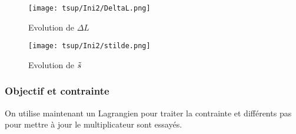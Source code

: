 \documentclass[11pt,a4paper]{article}
\begin{document}
\begin{itemize}
	\begin{figure}[H]
		\begin{minipage}{0.45\textwidth}
			\centering
			\texttt{[image: tsup/Ini2/DeltaL.png]}
			\caption{Evolution de $\Delta L$}
		\end{minipage}
		\begin{minipage}{0.45\textwidth}
			\centering
			\texttt{[image: tsup/Ini2/stilde.png]}
			\caption{Evolution de $\tilde{s}$}
		\end{minipage}
	\end{figure}
	
\end{itemize}



\subsubsection*{Objectif et contrainte}
On utilise maintenant un Lagrangien pour traiter la contrainte et différents pas pour mettre à jour le multiplicateur sont essayés.
\end{document}
